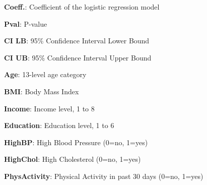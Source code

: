 \documentclass[11pt]{article}
\begin{document}
\begin{codeoutput}
\begin{table}[h]
\caption{Association Between Physical Activity and Diabetes Prevalence}
\label{table:assoc_pa_diabetes}
\begin{threeparttable}
\renewcommand{\TPTminimum}{\linewidth}
\begin{tablenotes}
\footnotesize
\item \textbf{Coeff.}: Coefficient of the logistic regression model
\item \textbf{Pval}: P-value
\item \textbf{CI LB}: 95\% Confidence Interval Lower Bound
\item \textbf{CI UB}: 95\% Confidence Interval Upper Bound
\item \textbf{Age}: 13-level age category
\item \textbf{BMI}: Body Mass Index
\item \textbf{Income}: Income level, 1 to 8
\item \textbf{Education}: Education level, 1 to 6
\item \textbf{HighBP}: High Blood Pressure (0=no, 1=yes)
\item \textbf{HighChol}: High Cholesterol (0=no, 1=yes)
\item \textbf{PhysActivity}: Physical Activity in past 30 days (0=no, 1=yes)
\end{tablenotes}
\end{threeparttable}
\end{table}

\end{codeoutput}
\end{document}

